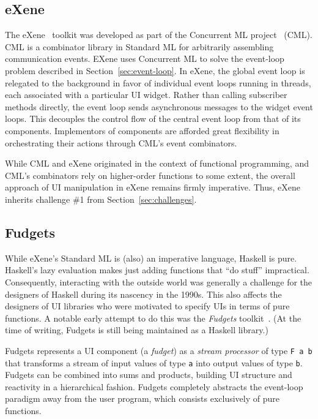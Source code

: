 \documentclass[sigplan,review,screen]{acmart}
\begin{document}
\subsection{eXene}

The eXene~\cite{eXene} toolkit was developed as part of the Concurrent
ML project~\cite{ConcurrentML} (CML).  CML is a combinator library in
Standard ML for arbitrarily assembling communication events.  EXene
uses Concurrent ML to solve the event-loop problem described in
Section~\ref{sec:event-loop}.  In eXene, the global event loop is
relegated to the background in favor of individual event loops running
in threads, each associated with a particular UI widget.  Rather than calling
subscriber methods directly, the event loop sends asynchronous
messages to the widget event loops.  This decouples the control flow
of the central event loop from that of its components.  Implementors
of components are afforded great flexibility in orchestrating their
actions through CML's event combinators.

While CML and eXene originated in the context of functional
programming, and CML's combinators rely on higher-order functions to
some extent, the overall approach of UI manipulation in eXene remains
firmly imperative.  Thus, eXene inherits challenge \#1 from Section~\ref{sec:challenges}.

\subsection{Fudgets}

While eXene's Standard ML is (also) an imperative language, Haskell is pure.
Haskell's lazy evaluation makes just adding functions that ``do
stuff'' impractical.  Consequently, interacting with the outside world
was generally a challenge for the designers of Haskell during its
nascency in the 1990s.  This also affects the designers of UI
libraries who were motivated to specify UIs in terms of pure
functions.  A notable early attempt to do this was the
\textit{Fudgets} toolkit~\cite{Fudgets}.  (At the time of writing,
Fudgets is still being maintained as a Haskell library.)

Fudgets represents a UI component (a \textit{fudget}) as a
\textit{stream processor} of type \verb|F a b| that transforms a
stream of input values of type \texttt{a} into output values of type
\texttt{b}.  Fudgets can be combined into sums and products, building
UI structure and reactivity in a hierarchical fashion.  Fudgets
completely abstracts the event-loop paradigm away from the user
program, which consists exclusively of pure functions.
\end{document}
